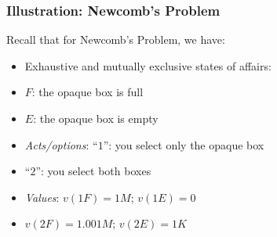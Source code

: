 \begin{frame}
\frametitle{Illustration: Newcomb's Problem}

Recall that for Newcomb's Problem, we have:

\begin{itemize}%

\item Exhaustive and mutually exclusive states of affairs: 
\item[] $F$: the opaque box is full 

\item[] $E$: the opaque box is empty

\item \textit{Acts/options}: ``$1$'': you select only the opaque box 

\item[] ``$2$'': you select both boxes

\item \textit{Values}: $v(1 F) = 1M$; $v(1 E) = 0$

\item[] $v(2 F) = 1.001M$; $v(2 E) = 1K$


\end{itemize}
\end{frame}

